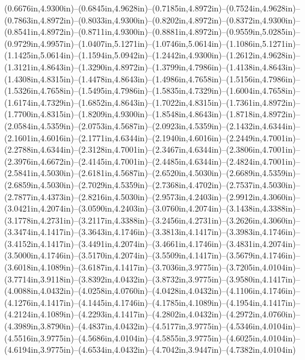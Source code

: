 (0.6676in,4.9300in)--(0.6845in,4.9628in)--(0.7185in,4.8972in)--(0.7524in,4.9628in)--(0.7863in,4.8972in)--(0.8033in,4.9300in)--(0.8202in,4.8972in)--(0.8372in,4.9300in)--(0.8541in,4.8972in)--(0.8711in,4.9300in)--(0.8881in,4.8972in)--(0.9559in,5.0285in)--(0.9729in,4.9957in)--(1.0407in,5.1271in)--(1.0746in,5.0614in)--(1.1086in,5.1271in)--(1.1425in,5.0614in)--(1.1594in,5.0942in)--(1.2442in,4.9300in)--(1.2612in,4.9628in)--(1.3121in,4.8643in)--(1.3290in,4.8972in)--(1.3799in,4.7986in)--(1.4138in,4.8643in)--(1.4308in,4.8315in)--(1.4478in,4.8643in)--(1.4986in,4.7658in)--(1.5156in,4.7986in)--(1.5326in,4.7658in)--(1.5495in,4.7986in)--(1.5835in,4.7329in)--(1.6004in,4.7658in)--(1.6174in,4.7329in)--(1.6852in,4.8643in)--(1.7022in,4.8315in)--(1.7361in,4.8972in)--(1.7700in,4.8315in)--(1.8209in,4.9300in)--(1.8548in,4.8643in)--(1.8718in,4.8972in)--(2.0584in,4.5359in)--(2.0753in,4.5687in)--(2.0923in,4.5359in)--(2.1432in,4.6344in)--(2.1601in,4.6016in)--(2.1771in,4.6344in)--(2.1940in,4.6016in)--(2.2449in,4.7001in)--(2.2788in,4.6344in)--(2.3128in,4.7001in)--(2.3467in,4.6344in)--(2.3806in,4.7001in)--(2.3976in,4.6672in)--(2.4145in,4.7001in)--(2.4485in,4.6344in)--(2.4824in,4.7001in)--(2.5841in,4.5030in)--(2.6181in,4.5687in)--(2.6520in,4.5030in)--(2.6689in,4.5359in)--(2.6859in,4.5030in)--(2.7029in,4.5359in)--(2.7368in,4.4702in)--(2.7537in,4.5030in)--(2.7877in,4.4373in)--(2.8216in,4.5030in)--(2.9573in,4.2403in)--(2.9912in,4.3060in)--(3.0421in,4.2074in)--(3.0590in,4.2403in)--(3.0760in,4.2074in)--(3.1438in,4.3388in)--(3.1778in,4.2731in)--(3.2117in,4.3388in)--(3.2456in,4.2731in)--(3.2626in,4.3060in)--(3.3474in,4.1417in)--(3.3643in,4.1746in)--(3.3813in,4.1417in)--(3.3983in,4.1746in)--(3.4152in,4.1417in)--(3.4491in,4.2074in)--(3.4661in,4.1746in)--(3.4831in,4.2074in)--(3.5000in,4.1746in)--(3.5170in,4.2074in)--(3.5509in,4.1417in)--(3.5679in,4.1746in)--(3.6018in,4.1089in)--(3.6187in,4.1417in)--(3.7036in,3.9775in)--(3.7205in,4.0104in)--(3.7714in,3.9118in)--(3.8392in,4.0432in)--(3.8732in,3.9775in)--(3.9580in,4.1417in)--(4.0088in,4.0432in)--(4.0258in,4.0760in)--(4.0428in,4.0432in)--(4.1106in,4.1746in)--(4.1276in,4.1417in)--(4.1445in,4.1746in)--(4.1785in,4.1089in)--(4.1954in,4.1417in)--(4.2124in,4.1089in)--(4.2293in,4.1417in)--(4.2802in,4.0432in)--(4.2972in,4.0760in)--(4.3989in,3.8790in)--(4.4837in,4.0432in)--(4.5177in,3.9775in)--(4.5346in,4.0104in)--(4.5516in,3.9775in)--(4.5686in,4.0104in)--(4.5855in,3.9775in)--(4.6025in,4.0104in)--(4.6194in,3.9775in)--(4.6534in,4.0432in)--(4.7042in,3.9447in)--(4.7382in,4.0104in) 